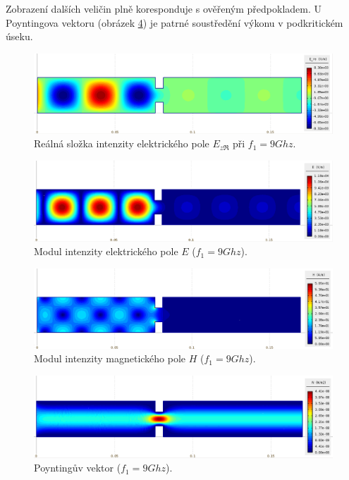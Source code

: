 Zobrazení dalších veličin plně koresponduje s ověřeným předpokladem. U Poyntingova vektoru (obrázek \ref{obr:priklad_R100narrow_N}) je patrné soustředění výkonu v podkritickém úseku.
\begin{figure}[!h]
	\centering
	\includegraphics[width=15cm]{priklad_R100narrow_Ere_9Ghz.png}
	\caption{Reálná složka intenzity elektrického pole $E_{z\Re}$ při $f_1 = 9\unit{Ghz}$.}
	\label{obr:priklad_R100narrow_Ere_9Ghz}
\end{figure}
\begin{figure}[!h]
	\centering
	\includegraphics[width=15cm]{priklad_R100narrow_E.png}
	\caption{Modul intenzity elektrického pole $E$ ($f_1 = 9\unit{Ghz}$).}
	\label{obr:priklad_R100narrow_N}
\end{figure}
\begin{figure}[!h]
	\centering
	\includegraphics[width=15cm]{priklad_R100narrow_H.png}
	\caption{Modul intenzity magnetického pole $H$ ($f_1 = 9\unit{Ghz}$).}
	\label{obr:priklad_R100narrow_H}
\end{figure}
\begin{figure}[!h]
	\centering
	\includegraphics[width=15cm]{priklad_R100narrow_N.png}
	\caption{Poyntingův vektor ($f_1 = 9\unit{Ghz}$).}
	\label{obr:priklad_R100narrow_N}
\end{figure}

